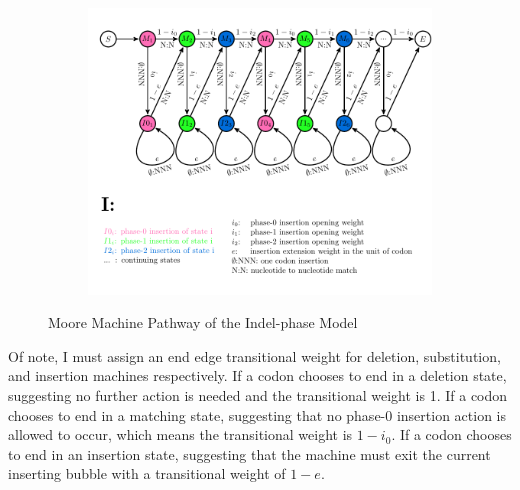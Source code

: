 \begin{figure}[H]\ContinuedFloat
    \centering
     \begin{minipage}[t]{1\textwidth}
     \begin{subfigure}{\textwidth}
       \includegraphics[width=\linewidth]{Fig1.3.pdf}
     \end{subfigure}
     \caption{Moore Machine Pathway of the Indel-phase Model}
    \end{minipage}
\end{figure}
%
Of note, I must assign an end edge transitional weight for deletion, substitution, and insertion machines respectively. If a codon chooses to end in a deletion state, suggesting no further action is needed and the transitional weight is 1. If a codon chooses to end in a matching state, suggesting that no phase-0 insertion action is allowed to occur, which means the transitional weight is $1-i_0$. If a codon chooses to end in an insertion state, suggesting that the machine must exit the current inserting bubble with a transitional weight of $1-e$. 

